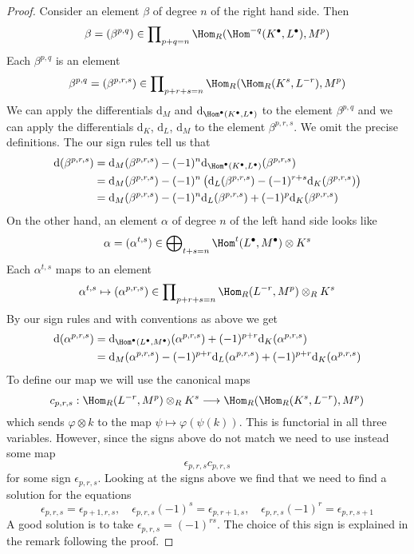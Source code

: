 \begin{proof}
Consider an element $\beta$ of degree $n$ of the right hand side.
Then
$$
\beta = (\beta^{p, q}) \in
\prod\nolimits_{p + q = n} \Hom_R(\Hom^{-q}(K^\bullet, L^\bullet), M^p)
$$
Each $\beta^{p, q}$ is an element
$$
\beta^{p, q} = (\beta^{p, r, s}) \in
\prod\nolimits_{p + r + s = n} \Hom_R(\Hom_R(K^s, L^{-r}), M^p)
$$
We can apply the differentials $\text{d}_M$ and
$\text{d}_{\Hom^\bullet(K^\bullet, L^\bullet)}$
to the element $\beta^{p, q}$ and we can apply the
differentials $\text{d}_K$, $\text{d}_L$, $\text{d}_M$
to the element $\beta^{p, r, s}$. We omit the precise definitions.
The our sign rules tell us that
\begin{align*}
\text{d}(\beta^{p, r, s})
& =
\text{d}_M(\beta^{p, r, s})
- (-1)^n \text{d}_{\Hom^\bullet(K^\bullet, L^\bullet)}(\beta^{p, r, s}) \\
& =
\text{d}_M(\beta^{p, r, s})
- (-1)^n \left(
\text{d}_L(\beta^{p, r, s}) - (-1)^{r + s} \text{d}_K(\beta^{p, r, s})
\right) \\
& =
\text{d}_M(\beta^{p, r, s})
- (-1)^n \text{d}_L(\beta^{p, r, s})
+ (-1)^p \text{d}_K(\beta^{p, r, s})
\end{align*}
On the other hand, an element $\alpha$
of degree $n$ of the left hand side looks like
$$
\alpha = (\alpha^{t, s}) \in
\bigoplus\nolimits_{t + s = n} \Hom^t(L^\bullet, M^\bullet) \otimes K^s
$$
Each $\alpha^{t, s}$ maps to an element
$$
\alpha^{t, s} \mapsto (\alpha^{p, r, s}) \in
\prod\nolimits_{p + r + s = n} \Hom_R(L^{-r}, M^p) \otimes_R K^s
$$
By our sign rules and with conventions as above we get
\begin{align*}
\text{d}(\alpha^{p, r, s})
& =
\text{d}_{\Hom^\bullet(L^\bullet, M^\bullet)}(\alpha^{p, r, s})
+ (-1)^{p + r} \text{d}_K(\alpha^{p, r, s}) \\
& =
\text{d}_M(\alpha^{p, r, s})
- (-1)^{p + r} \text{d}_L(\alpha^{p, r, s})  +
(-1)^{p + r} \text{d}_K(\alpha^{p, r, s})
\end{align*}
To define our map we will use the canonical maps
$$
c_{p, r, s} : 
\Hom_R(L^{-r}, M^p) \otimes_R K^s
\longrightarrow
\Hom_R(\Hom_R(K^s, L^{-r}), M^p)
$$
which sends $\varphi \otimes k$ to the map $\psi \mapsto \varphi(\psi(k))$.
This is functorial in all three variables.
However, since the signs above do not match we need to use instead
some map
$$
\epsilon_{p, r, s} c_{p, r, s}
$$
for some sign $\epsilon_{p, r, s}$. Looking at the signs above we
find that we need to find a solution for the equations
$$
\epsilon_{p, r, s} = \epsilon_{p + 1, r, s}, \quad
\epsilon_{p, r, s} (-1)^s = \epsilon_{p, r + 1, s}, \quad
\epsilon_{p, r, s} (-1)^r = \epsilon_{p, r, s + 1}
$$
A good solution is to take $\epsilon_{p, r, s} = (-1)^{rs}$.
The choice of this sign is explained in the remark following
the proof.
\end{proof}

